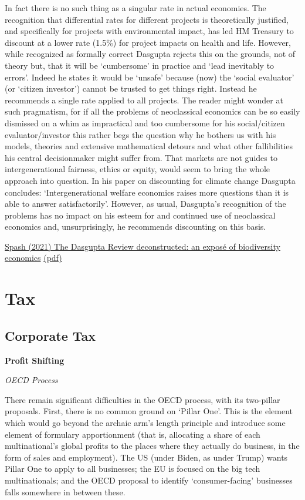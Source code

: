 \documentclass[
]{book}
\begin{document}
In fact there is no such thing as a singular rate in actual economies. The recognition that
differential rates for different projects is theoretically justified, and specifically for projects with
environmental impact, has led HM Treasury to discount at a lower rate (1.5\%) for project impacts on health
and life. However, while recognized as formally correct Dasgupta rejects this
on the grounds, not of theory but, that it will be `cumbersome' in practice and `lead inevitably to
errors'. Indeed he states it would be `unsafe' because (now) the `social evaluator' (or `citizen
investor') cannot be trusted to get things right. Instead he recommends a single rate applied to all
projects. The reader might wonder at such pragmatism, for if all the problems of neoclassical
economics can be so easily dismissed on a whim as impractical and too cumbersome for his
social/citizen evaluator/investor this rather begs the question why he bothers us with his models,
theories and extensive mathematical detours and what other fallibilities his central
decisionmaker might suffer from.
That markets are not guides to intergenerational fairness, ethics or equity, would seem to bring
the whole approach into question. In his paper on discounting for climate change Dasgupta
concludes: `Intergenerational welfare economics raises more questions than it is able to
answer satisfactorily'. However, as usual, Dasgupta's recognition of the problems has no impact
on his esteem for and continued use of neoclassical economics and, unsurprisingly, he recommends
discounting on this basis.

\href{https://www.tandf\%20online.com/doi/full/10.1080/14747731.2021.1929007}{Spash (2021) The Dasgupta Review deconstructed: an exposé of biodiversity economics}
\href{pdf/Spash_2021_Dasgupta_Deconstructed.pdf}{(pdf)}

\hypertarget{tax}{%
\chapter{Tax}\label{tax}}

\hypertarget{corporate-tax}{%
\section{Corporate Tax}\label{corporate-tax}}

\textbf{Profit Shifting}

\emph{OECD Process}

There remain significant difficulties in the OECD process, with its two-pillar proposals. First, there is no common ground on `Pillar One'. This is the element which would go beyond the archaic arm's length principle and introduce some element of formulary apportionment (that is, allocating a share of each multinational's global profits to the places where they actually do business, in the form of sales and employment). The US (under Biden, as under Trump) wants Pillar One to apply to all businesses; the EU is focused on the big tech multinationals; and the OECD proposal to identify `consumer-facing' businesses falls somewhere in between these.
\end{document}
